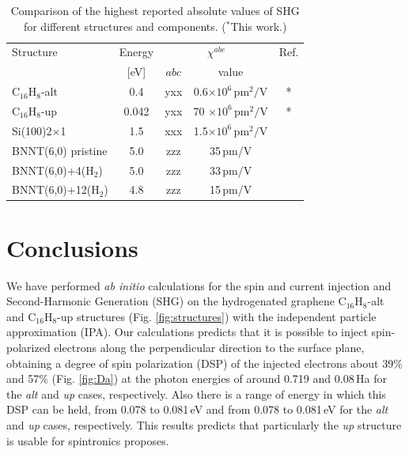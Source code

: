 \documentclass[pss]{wiley2sp} %
\begin{document}
\begin{table}[htb]%
  \sidecaption
  \begin{tabular}{lcccc}
  \hline
    Structure & Energy & \multicolumn{2}{c}{$\chi^{abc} $} &  Ref.\\
    \cline{3-4}
              & [eV]   & $abc$ & value \\
    \hline
    C$_{16}$H$_{8}$-alt    & 0.4   & yxx   & 0.6$\times 10^{6}\,\mathrm{pm}^{2}/\mathrm{V}$  & *     \\
    C$_{16}$H$_{8}$-up     & 0.042 & yxx   & 70 $\times 10^{6}\,\mathrm{pm}^{2}/\mathrm{V}$  & *     \\
    Si(100)2$\times$1      & 1.5   & xxx   & 1.5$\times 10^{6}\,\mathrm{pm}^{2}/\mathrm{V}$  & \cite{andersonPRB15}  \\
    BNNT(6,0) pristine    & 5.0   & zzz   & 35\,pm/V  & \cite{salazar2014molecular} \\
    BNNT(6,0)+4(H$_{2}$)  & 5.0   & zzz   & 33\,pm/V  & \cite{salazar2014molecular} \\
    BNNT(6,0)+12(H$_{2}$) & 4.8   & zzz   & 15\,pm/V  & \cite{salazar2014molecular} \\
  \hline
  \end{tabular}
  \caption[]{%
  Comparison of the highest reported absolute values of SHG for 
    different structures and components. ($^{*}$This work.)}
  \label{tab:shgcomp}
\end{table}




\section{Conclusions} %
\label{sec:conclusions}

We have performed \emph{ab initio} calculations for the spin and current injection and
Second-Harmonic Generation (SHG) on the hydrogenated graphene C$_{16}$H$_{8}$-alt and
C$_{16}$H$_{8}$-up structures (Fig. \ref{fig:structures}) with the
independent particle approximation (IPA). Our calculations predicts that it is
possible to inject spin-polarized electrons along the perpendicular direction
to the surface plane, obtaining a degree of spin polarization (DSP) of the
injected electrons about 39\% and 57\%  (Fig. \ref{fig:Da}) at the photon energies of around 0.719
and 0.08\,Ha  for the \emph{alt} and \emph{up} cases, respectively. Also there is a range of energy
in which this DSP can be held, from 0.078 to 0.081\,eV and from 0.078 to 0.081\,eV for the \emph{alt} and \emph{up} cases, respectively. This results predicts that particularly the \emph{up} structure is usable for spintronics proposes.
\end{document}

